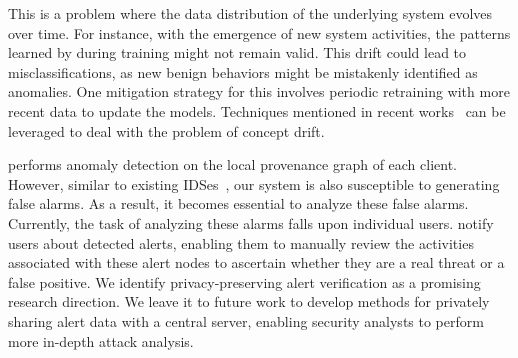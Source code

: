 \label{sec:discussion}




 This is a problem where the data distribution of the underlying system evolves over time. For instance, with the emergence of new system activities, the patterns learned by \Sys during training might not remain valid. This drift could lead to misclassifications, as new benign behaviors might be mistakenly identified as anomalies. One mitigation strategy for this involves periodic retraining with more recent data to update the models. Techniques mentioned in recent works~\cite{lu2018learning, barbero2022transcending,jordaney2017transcend} can be leveraged to deal with the problem of concept drift. %

 \Sys performs anomaly detection on the local provenance graph of each client. However, similar to existing IDSes~\cite{flash2024,cheng2023kairos,wang2022threatrace}, our system is also susceptible to generating false alarms. As a result, it becomes essential to analyze these false alarms. Currently, the task of analyzing these alarms falls upon individual users. \Sys notify users about detected alerts, enabling them to manually review the activities associated with these alert nodes to ascertain whether they are a real threat or a false positive. We identify privacy-preserving alert verification as a promising research direction. We leave it to future work to develop methods for privately sharing alert data with a central server, enabling security analysts to perform more in-depth attack analysis.


